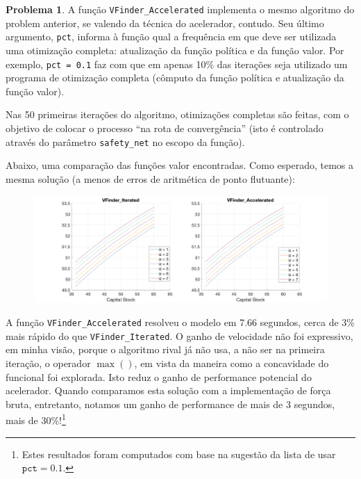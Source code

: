 \documentclass[11pt]{article}
\theoremstyle{definition}
\theoremstyle{definition}
\newtheorem{problema}{Problema}
\theoremstyle{solution}
\begin{document}
	\begin{problema}
		A função \texttt{VFinder\_Accelerated} implementa o mesmo algoritmo do problem anterior, se valendo da técnica do acelerador, contudo. Seu último argumento, \texttt{pct}, informa à função qual a frequência em que deve ser utilizada uma otimização completa: atualização da função política e da função valor. Por exemplo, \texttt{pct = 0.1} faz com que em apenas 10\% das iterações seja utilizado um programa de otimização completa (cômputo da função política e atualização da função valor). 
		
		Nas 50 primeiras iterações do algoritmo, otimizações completas são feitas, com o objetivo de colocar o processo ``na rota de convergência'' (isto é controlado através do parâmetro \texttt{safety\_net} no escopo da função).
		
		Abaixo, uma comparação das funções valor encontradas. Como esperado, temos a mesma solução (a menos de erros de aritmética de ponto flutuante):
		\begin{figure}[h!]
			\centering
			\includegraphics[scale = 0.23]{iterated_vs_accelerated}
		\end{figure}
		
		A função \texttt{VFinder\_Accelerated} resolveu o modelo em 7.66 segundos, cerca de 3\% mais rápido do que \texttt{VFinder\_Iterated}. O ganho de velocidade não foi expressivo, em minha visão, porque o algoritmo rival já não usa, a não ser na primeira iteração, o operador $\max()$, em vista da maneira como a concavidade do funcional foi explorada. Isto reduz o ganho de performance potencial do acelerador. Quando comparamos esta solução com a implementação de força bruta, entretanto, notamos um ganho de performance de mais de 3 segundos, mais de 30\%!\footnote{Estes resultados foram computados com base na sugestão da lista de usar $\texttt{pct}= 0.1$.}
		
		
	\end{problema}
	
\end{document}
